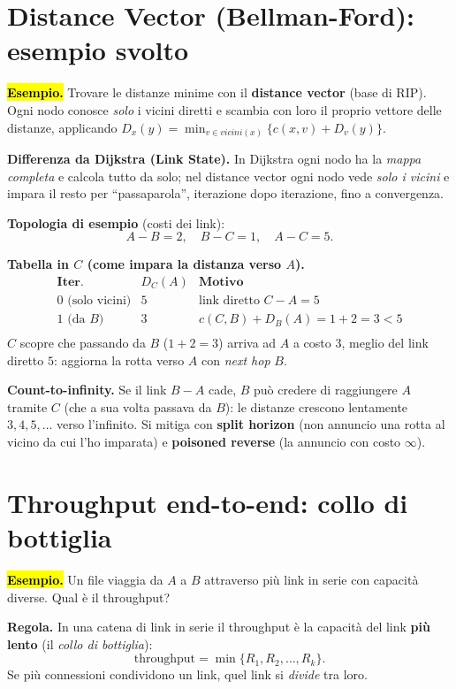 \documentclass[11pt,a4paper]{report}
\begin{document}
\section{Distance Vector (Bellman-Ford): esempio svolto}
\label{teoria:dv}
\hl{\textbf{Esempio.}} Trovare le distanze minime con il \textbf{distance
vector} (base di RIP). Ogni nodo conosce \emph{solo} i vicini diretti e scambia
con loro il proprio vettore delle distanze, applicando
$D_x(y)=\min_{v\in vicini(x)}\{c(x,v)+D_v(y)\}$.

\textbf{Differenza da Dijkstra (Link State).} In Dijkstra ogni nodo ha la
\emph{mappa completa} e calcola tutto da solo; nel distance vector ogni nodo vede
\emph{solo i vicini} e impara il resto per ``passaparola'', iterazione dopo
iterazione, fino a convergenza.

\textbf{Topologia di esempio} (costi dei link):
\[ A\!-\!B=2,\quad B\!-\!C=1,\quad A\!-\!C=5. \]

\textbf{Tabella in $C$ (come impara la distanza verso $A$).}
\[
\begin{array}{c|c|l}
\textbf{Iter.} & D_C(A) & \textbf{Motivo} \\ \hline
0 \text{ (solo vicini)} & 5 & \text{link diretto } C\!-\!A=5 \\
1 \text{ (da } B) & 3 & c(C,B)+D_B(A)=1+2=3 < 5 \\
\end{array}
\]
$C$ scopre che passando da $B$ ($1+2=3$) arriva ad $A$ a costo $3$, meglio del
link diretto $5$: aggiorna la rotta verso $A$ con \emph{next hop} $B$.

\textbf{Count-to-infinity.} Se il link $B\!-\!A$ cade, $B$ può credere di
raggiungere $A$ tramite $C$ (che a sua volta passava da $B$): le distanze
crescono lentamente $3,4,5,\dots$ verso l'infinito. Si mitiga con \textbf{split
horizon} (non annuncio una rotta al vicino da cui l'ho imparata) e
\textbf{poisoned reverse} (la annuncio con costo $\infty$).

\section{Throughput end-to-end: collo di bottiglia}
\label{teoria:bottleneck}
\hl{\textbf{Esempio.}} Un file viaggia da $A$ a $B$ attraverso più link in serie
con capacità diverse. Qual è il throughput?

\textbf{Regola.} In una catena di link in serie il throughput è la capacità del
link \textbf{più lento} (il \emph{collo di bottiglia}):
\[ \text{throughput}=\min\{R_1, R_2, \dots, R_k\}. \]
Se più connessioni condividono un link, quel link si \emph{divide} tra loro.
\end{document}
